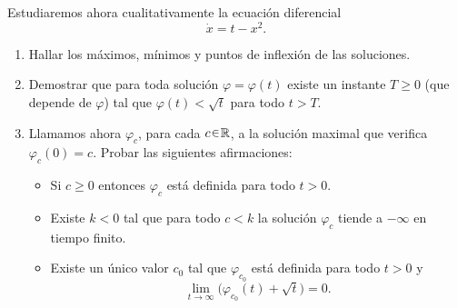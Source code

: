 \begin{ejer}
Estudiaremos ahora cualitativamente la ecuación diferencial
\[
    \dot{x} = t - x^2.
\]
\begin{enumerate}[label = (\alph*)]
    \item Hallar los máximos, mínimos y puntos de inflexión de las soluciones.
    
    \item Demostrar que para toda solución $\varphi = \varphi(t)$ existe un instante
    $T \geq 0$ (que depende de $\varphi$) tal que $\varphi(t) < \sqrt{t}$ para todo $t > T.$
    
    \item Llamamos ahora $\varphi_c$, para cada $c \en \mathbb{R}$, a la solución maximal que
    verifica $\varphi_c(0) = c$. Probar las siguientes afirmaciones:
    \begin{itemize}
        \item Si $c \geq 0$ entonces $\varphi_c$ está definida para todo $t > 0$.
        \item Existe $k < 0$ tal que para todo $c < k$ la solución $\varphi_c$ tiende a $-\infty$ en tiempo finito.
        \item Existe un único valor $c_0$ tal que $\varphi_{c_0}$ está definida para todo $t > 0$ y
        \[
            \lim_{t \to \infty} \big( \varphi_{c_0}(t) + \sqrt{t} \big) = 0.
        \]
    \end{itemize}
\end{enumerate}
\end{ejer}
